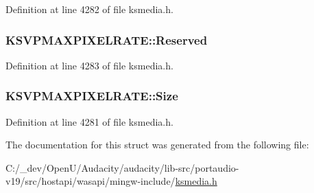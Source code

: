 Definition at line 4282 of file ksmedia.\+h.

\subsubsection[{\texorpdfstring{Reserved}{Reserved}}]{ K\+S\+V\+P\+M\+A\+X\+P\+I\+X\+E\+L\+R\+A\+T\+E\+::\+Reserved}\hypertarget{struct_k_s_v_p_m_a_x_p_i_x_e_l_r_a_t_e_a3d036175345c5f607ac8010faf00b2b6}{}\label{struct_k_s_v_p_m_a_x_p_i_x_e_l_r_a_t_e_a3d036175345c5f607ac8010faf00b2b6}


Definition at line 4283 of file ksmedia.\+h.

\subsubsection[{\texorpdfstring{Size}{Size}}]{ K\+S\+V\+P\+M\+A\+X\+P\+I\+X\+E\+L\+R\+A\+T\+E\+::\+Size}\hypertarget{struct_k_s_v_p_m_a_x_p_i_x_e_l_r_a_t_e_a1d6bf8a3f16b21747c028be5eebc4d15}{}\label{struct_k_s_v_p_m_a_x_p_i_x_e_l_r_a_t_e_a1d6bf8a3f16b21747c028be5eebc4d15}


Definition at line 4281 of file ksmedia.\+h.



The documentation for this struct was generated from the following file\+:\begin{DoxyCompactItemize}
\item 
C\+:/\+\_\+dev/\+Open\+U/\+Audacity/audacity/lib-\/src/portaudio-\/v19/src/hostapi/wasapi/mingw-\/include/\hyperlink{ksmedia_8h}{ksmedia.\+h}\end{DoxyCompactItemize}
